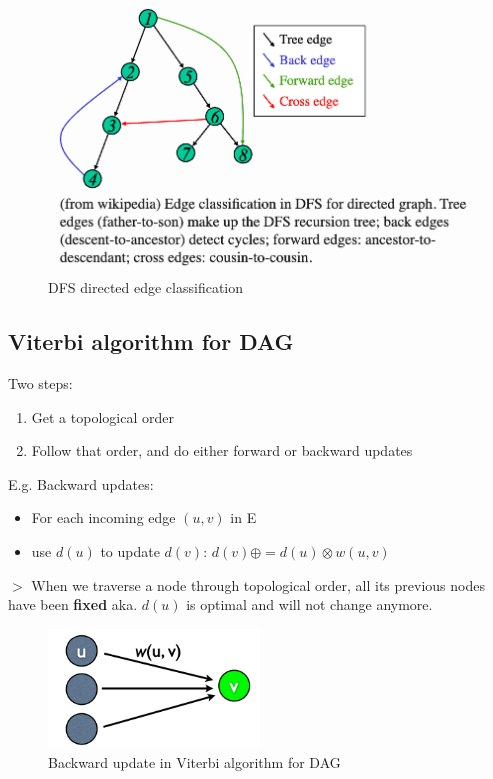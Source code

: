 \documentclass[12pt,a4paper]{article}
\newcommand{\remark}[1]{
    {\small $>$ {\color{blue} #1}}
}
\begin{document}
\begin{figure}[h]
    \centering
    \includegraphics[width=\textwidth]{./images/dfs_directed_class.png}
    \caption{DFS directed edge classification}
\end{figure}

\subsection*{Viterbi algorithm for DAG}

Two steps:

\begin{enumerate}
    \item Get a topological order
    \item Follow that order, and do either forward or backward updates
\end{enumerate}

E.g. Backward updates:

\begin{itemize}
    \item For each incoming edge \((u,v)\) in E
    \item use \(d(u)\) to update \(d(v)\): \(d(v) \oplus=d(u)\otimes w(u,v)\)
\end{itemize}

\remark{When we traverse a node through topological order, all its previous nodes have been \textbf{fixed} aka. \(
d(u)\) is optimal and will not change anymore.}

\begin{figure}[H]
    \centering
    \includegraphics[width=0.5\textwidth]{./images/backward_update.png}
    \caption{Backward update in Viterbi algorithm for DAG}
\end{figure}
\end{document}
